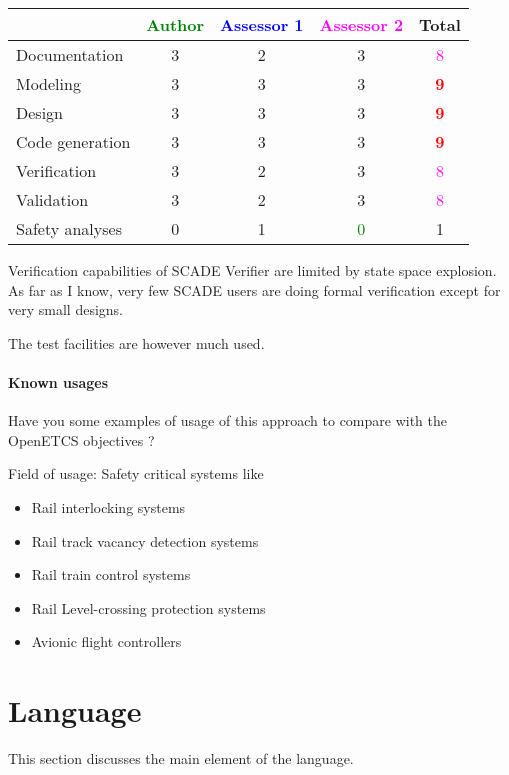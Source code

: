 \begin{tabular}{|l | c | c | c | c|}
\hline
& \textcolor{green}{Author} & \textcolor{blue}{Assessor 1} & \textcolor{magenta}{Assessor 2} & Total \\
\hline 
Documentation &  3  & 2     &3 & \textcolor{magenta}{8}  \\
\hline
Modeling &  3  & 3     &3 & \textcolor{red}{\textbf{9}} \\
\hline
Design &  3  & 3     &3 & \textcolor{red}{\textbf{9}} \\
\hline
Code generation &  3  & 3     &3 & \textcolor{red}{\textbf{9}} \\
\hline
Verification &  3  & 2     &3 & \textcolor{magenta}{8} \\
\hline
Validation &  3  & 2     &3 & \textcolor{magenta}{8} \\
\hline
Safety analyses &  0  & 1     & \textcolor{green}{0}   & 1     \\
\hline
\end{tabular}


\begin{assessor1}
Verification capabilities of SCADE Verifier are limited by state space
explosion. As far as I know, very few SCADE users are doing formal
verification except for very small designs.

The test facilities are however much used.
\end{assessor1}


\paragraph{Known usages} Have you some examples of usage of this approach to  compare with the OpenETCS objectives ?

Field of usage: Safety critical systems like
\begin{itemize}
	\item Rail interlocking systems
	\item Rail track vacancy detection systems
	\item Rail train control systems
	\item Rail Level-crossing protection systems
	\item Avionic flight controllers
\end{itemize}

\section{Language}
This section discusses the main element of the language.

